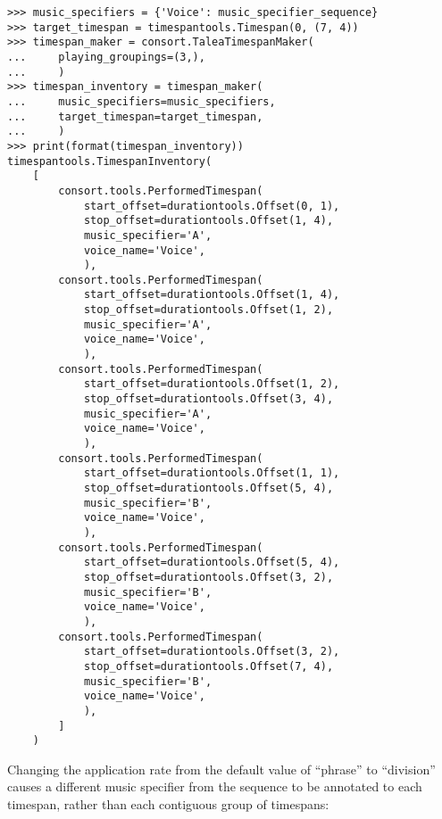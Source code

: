 \begin{abjadbookoutput}
\begin{singlespacing}
\vspace{-0.5\baselineskip}
\begin{verbatim}
>>> music_specifiers = {'Voice': music_specifier_sequence}
>>> target_timespan = timespantools.Timespan(0, (7, 4))
>>> timespan_maker = consort.TaleaTimespanMaker(
...     playing_groupings=(3,),
...     )
>>> timespan_inventory = timespan_maker(
...     music_specifiers=music_specifiers,
...     target_timespan=target_timespan,
...     )
>>> print(format(timespan_inventory))
timespantools.TimespanInventory(
    [
        consort.tools.PerformedTimespan(
            start_offset=durationtools.Offset(0, 1),
            stop_offset=durationtools.Offset(1, 4),
            music_specifier='A',
            voice_name='Voice',
            ),
        consort.tools.PerformedTimespan(
            start_offset=durationtools.Offset(1, 4),
            stop_offset=durationtools.Offset(1, 2),
            music_specifier='A',
            voice_name='Voice',
            ),
        consort.tools.PerformedTimespan(
            start_offset=durationtools.Offset(1, 2),
            stop_offset=durationtools.Offset(3, 4),
            music_specifier='A',
            voice_name='Voice',
            ),
        consort.tools.PerformedTimespan(
            start_offset=durationtools.Offset(1, 1),
            stop_offset=durationtools.Offset(5, 4),
            music_specifier='B',
            voice_name='Voice',
            ),
        consort.tools.PerformedTimespan(
            start_offset=durationtools.Offset(5, 4),
            stop_offset=durationtools.Offset(3, 2),
            music_specifier='B',
            voice_name='Voice',
            ),
        consort.tools.PerformedTimespan(
            start_offset=durationtools.Offset(3, 2),
            stop_offset=durationtools.Offset(7, 4),
            music_specifier='B',
            voice_name='Voice',
            ),
        ]
    )
\end{verbatim}
\end{singlespacing}
\end{abjadbookoutput}

\noindent Changing the application rate from the default value of
\enquote{phrase} to \enquote{division} causes a different music specifier from
the sequence to be annotated to each timespan, rather than each contiguous
group of timespans:

\begin{comment}
<abjad>
music_specifier_sequence = new(
    music_specifier_sequence,
    application_rate='division',
    )
music_specifiers = {'Voice': music_specifier_sequence}
timespan_inventory = timespan_maker(
    music_specifiers=music_specifiers,
    target_timespan=target_timespan,
    )
print(format(timespan_inventory))
</abjad>
\end{comment}

